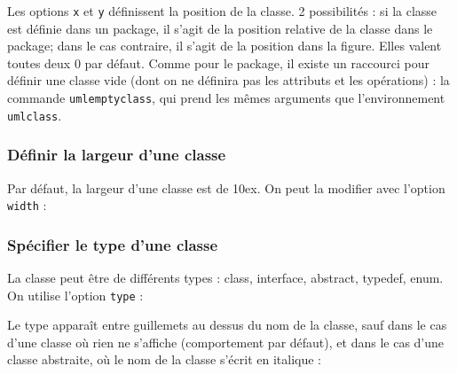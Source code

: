 \documentclass[a4paper,11pt]{report}
\newcommand{\inputTikZ}[1]{%
  }%
\newcommand{\inputTikZ}[1]{%
    \texttt{[image: fig/\#1.pdf]}%
  }%
\begin{document}
Les options {\tt x} et {\tt y} définissent la position de la classe. 2 possibilités : si la classe est définie dans un package, il s'agit de la position relative de la classe dans le package; dans le cas contraire, il s'agit de la position dans la figure. Elles valent toutes deux 0 par défaut. Comme pour le package, il existe un raccourci pour définir une classe vide (dont on ne définira pas les attributs et les opérations) : la commande {\tt umlemptyclass}, qui prend les mêmes arguments que l'environnement {\tt umlclass}.

\subsubsection{Définir la largeur d'une classe}

Par défaut, la largeur d'une classe est de 10ex. On peut la modifier avec l'option {\tt width} :

\medskip

\begin{minipage}{0.5\textwidth}

\end{minipage}
\begin{minipage}{0.4\textwidth}
\begin{center}
\inputTikZ{classwidth}
\end{center}
\end{minipage}

\subsubsection{Spécifier le type d'une classe}

La classe peut être de différents types : class, interface, abstract, typedef, enum. On utilise l'option {\tt type} :

\medskip

\begin{minipage}{0.5\textwidth}

\end{minipage}
\begin{minipage}{0.4\textwidth}
\begin{center}
\inputTikZ{classtype}
\end{center}
\end{minipage}

\medskip

Le type apparaît entre guillemets au dessus du nom de la classe, sauf dans le cas d'une classe où rien ne s'affiche (comportement par défaut), et dans le cas d'une classe abstraite, où le nom de la classe s'écrit en italique :
\end{document}
